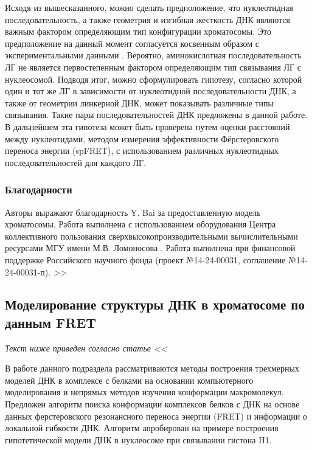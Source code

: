  Исходя из вышесказанного, можно сделать предположение, что нуклеотидная последовательность, а также геометрия и изгибная жесткость ДНК являются важным фактором определяющим тип конфигурации хроматосомы. Это предположение на данный момент согласуется косвенным образом с экспериментальными данными \cite{bednar_structure_2017,song_cryo-em_2014}. Вероятно, аминокислотная последовательность ЛГ не является первостепенным фактором определяющим тип связывания ЛГ с нуклеосомой.
Подводя итог, можно сформулировать гипотезу, согласно которой один и тот же ЛГ в зависимости от нуклеотидной последовательности ДНК, а также от геометрии линкерной ДНК, может показывать различные типы связывания. Такие пары последовательностей ДНК предложены в данной работе. В дальнейшем эта гипотеза может быть проверена путем оценки расстояний между нуклеотидами, методом измерения эффективности Фёрстеровского переноса энергии (spFRET), с использованием различных нуклеотидных последовательностей для каждого ЛГ.

\subsubsection{Благодарности}
Авторы выражают благодарность Y. Bai за предоставленную модель  хроматосомы. Работа выполнена с использованием оборудования Центра коллективного пользования сверхвысокопроизводительными вычислительными ресурсами МГУ имени М.В. Ломоносова \cite{voevodin_supercomputer_2019}. Работа выполнена при финансовой поддержке Российского научного фонда (проект №14-24-00031, соглашение №14-24-00031-п).
\textit{>>}



\subsection{Моделирование структуры ДНК в хроматосоме по данным FRET}

\textit{Текст ниже приведен согласно статье \cite{armeev_modeling_2016} <<}

В работе данного подраздела рассматриваются методы построения трехмерных моделей ДНК в комплексе с белками на основании компьютерного моделирования и непрямых методов изучения конформации макромолекул. Предложен алгоритм поиска конформации комплексов белков с ДНК на основе данных ферстеровского резонансного переноса энергии (FRET) и информации о локальной гибкости ДНК. Алгоритм апробирован на примере построения гипотетической модели ДНК в нуклеосоме при связывании гистона H1.


